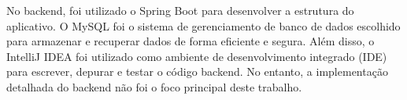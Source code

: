 %
%

No backend, foi utilizado o Spring Boot para desenvolver a estrutura do aplicativo. O MySQL foi o sistema de gerenciamento de banco de dados escolhido para armazenar e recuperar dados de forma eficiente e segura. Além disso, o IntelliJ IDEA foi utilizado como ambiente de desenvolvimento integrado (IDE) para escrever, depurar e testar o código backend. No entanto, a implementação detalhada do backend não foi o foco principal deste trabalho.

%
%
%
